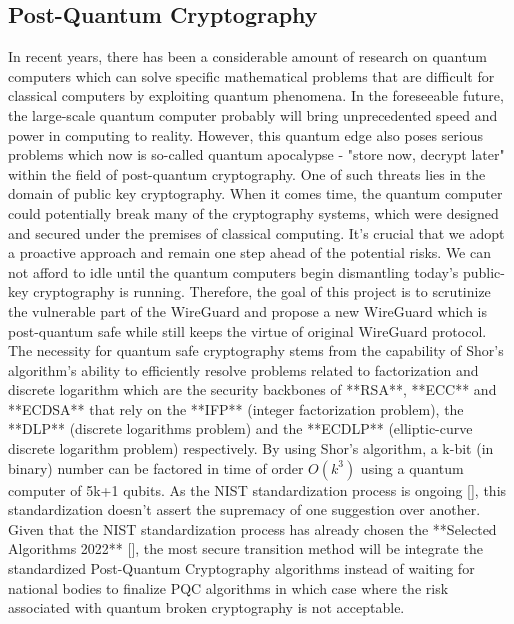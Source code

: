 \subsection{Post-Quantum Cryptography}
In recent years, there has been a considerable amount of research on quantum computers which can solve specific mathematical problems that are difficult for classical computers by exploiting quantum phenomena. In the foreseeable future, the large-scale quantum computer probably will bring unprecedented speed and power in computing to reality. However, this quantum edge also poses serious problems which now is so-called quantum apocalypse - "store now, decrypt later" within the field of post-quantum cryptography. One of such threats lies in the domain of public key cryptography. When it comes time, the quantum computer could potentially break many of the cryptography systems, which were designed and secured under the premises of classical computing. It's crucial that we adopt a proactive approach and remain one step ahead of the potential risks. We can not afford to idle until the quantum computers begin dismantling today’s public-key cryptography is running. Therefore, the goal of this project is to scrutinize the vulnerable part of the WireGuard and propose a new WireGuard which is post-quantum safe while still keeps the virtue of original WireGuard protocol. 
The necessity for quantum safe cryptography stems from the capability of Shor's algorithm's ability to efficiently resolve problems related to factorization and discrete logarithm which are the security backbones of **RSA**, **ECC** and **ECDSA** that rely on the **IFP** (integer factorization problem), the **DLP** (discrete logarithms problem) and the **ECDLP** (elliptic-curve discrete logarithm problem) respectively. By using Shor's algorithm, a k-bit (in binary) number can be factored in time of order $O(k^3)$ using a quantum computer of 5k+1 qubits. As the NIST standardization process is ongoing [], this standardization doesn't assert the supremacy of one suggestion over another. Given that the NIST standardization process has already chosen the **Selected Algorithms 2022** [], the most secure transition method will be integrate the standardized Post-Quantum Cryptography algorithms instead of waiting for national bodies to finalize PQC algorithms in which case where the risk associated with quantum broken cryptography is not acceptable.

